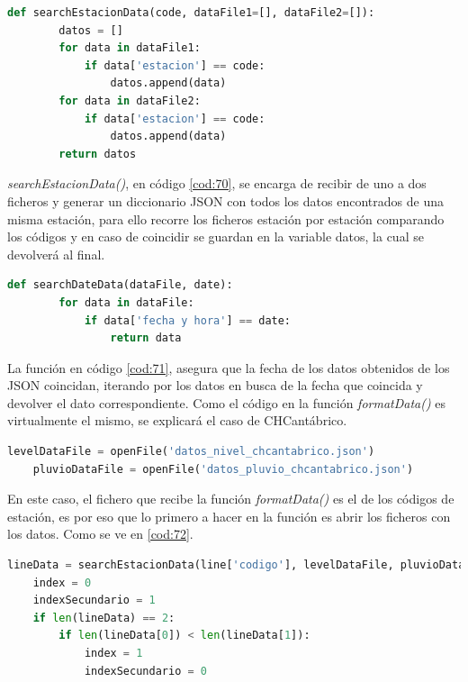 \begin{lstlisting}[language=Python, caption={Declaración función \textit{searchEstacionData()}, especifica en el formateo de datos de CHCantábrico y Agua en Navarra}, label=cod:70]
	def searchEstacionData(code, dataFile1=[], dataFile2=[]):
		datos = []
		for data in dataFile1:
			if data['estacion'] == code:
				datos.append(data)
		for data in dataFile2:
			if data['estacion'] == code:
				datos.append(data)
		return datos
\end{lstlisting}

\textit{searchEstacionData()}, en código \ref{cod:70}, se encarga de recibir de uno a dos ficheros y generar un diccionario JSON con todos los datos encontrados de una misma estación, para ello recorre los ficheros estación por estación comparando los códigos y en caso de coincidir se guardan en la variable datos, la cual se devolverá al final.

\begin{lstlisting}[language=Python, caption={Declaración función \textit{searchDateData()}}, label=cod:71]
	def searchDateData(dataFile, date):
		for data in dataFile:
			if data['fecha y hora'] == date:
				return data
\end{lstlisting}

La función en código \ref{cod:71}, asegura que la fecha de los datos obtenidos de los JSON coincidan, iterando por los datos en busca de la fecha que coincida y devolver el dato correspondiente. \newline
\newline
Como el código en la función \textit{formatData()} es virtualmente el mismo, se explicará el caso de CHCantábrico.

\begin{lstlisting}[language=Python, caption={Lectura de los ficheros de datos de CHCantábrico}, label=cod:72]
	levelDataFile = openFile('datos_nivel_chcantabrico.json')
	pluvioDataFile = openFile('datos_pluvio_chcantabrico.json')
\end{lstlisting}

En este caso, el fichero que recibe la función \textit{formatData()} es el de los códigos de estación, es por eso que lo primero a hacer en la función es abrir los ficheros con los datos. Como se ve en \ref{cod:72}.

\begin{lstlisting}[language=Python, caption={Dentro del bucle que itera por estaciones, obtención de los datos de la estacion y declaración de indices}, label=cod:73]
	lineData = searchEstacionData(line['codigo'], levelDataFile, pluvioDataFile)
	index = 0
	indexSecundario = 1
	if len(lineData) == 2:
		if len(lineData[0]) < len(lineData[1]):
			index = 1
			indexSecundario = 0
\end{lstlisting}

